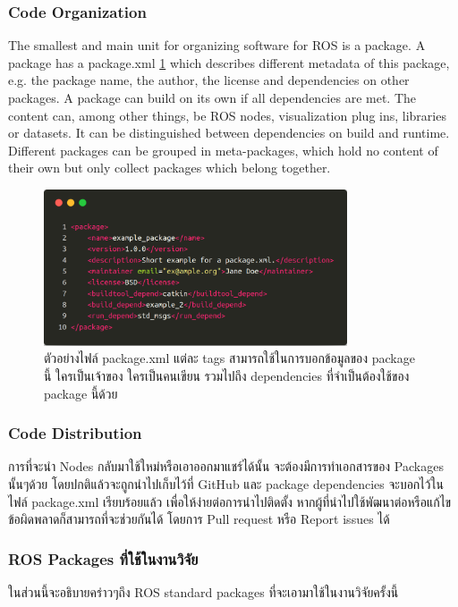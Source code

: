 \subsubsection*{Code Organization}
The smallest and main unit for organizing software for ROS is a package.  A package
has a
package.xml
\ref{fig:example_packagexml} which describes different metadata of this package,
e.g.  the package name, the author, the license and dependencies on other packages.
A package can build on its own if all dependencies are met.  The content can, among
other things, be ROS nodes, visualization plug ins, libraries or datasets.  It can be
distinguished between dependencies on build and runtime.  Different packages can
be grouped in meta-packages, which hold no content of their own but only collect
packages which belong together.

\begin{figure}[htbp]
    \centering
    \includegraphics[width=0.8\textwidth]{chapter2/images/example_packagexml.png}
	\caption{ตัวอย่างไฟล์ package.xml แต่ละ tags สามารถใช้ในการบอกข้อมูลของ package นี้
	ใครเป็นเจ้าของ ใครเป็นคนเขียน รวมไปถึง dependencies ที่จำเป็นต้องใช้ของ package นี้ด้วย}
    \label{fig:example_packagexml}
\end{figure}

\subsubsection*{Code Distribution}
การที่จะนำ Nodes กลับมาใช้ใหม่หรือเอาออกมาแชร์ได้นั้น จะต้องมีการทำเอกสารของ Packages นั้นๆด้วย
โดยปกติแล้วจะถูกนำไปเก็บไว้ที่ GitHub และ package dependencies จะบอกไว้ในไฟล์ package.xml
เรียบร้อยแล้ว เพื่อให้ง่ายต่อการนำไปติดตั้ง หากผู้ที่นำไปใช้พัฒนาต่อหรือแก้ไขข้อผิดพลาดก็สามารถที่จะช่วยกันได้
โดยการ Pull request หรือ Report issues ได้

\subsubsection*{ROS Packages ที่ใช้ในงานวิจัย}
ในส่วนนี้จะอธิบายคร่าวๆถึง ROS standard packages ที่จะเอามาใช้ในงานวิจัยครั้งนี้
